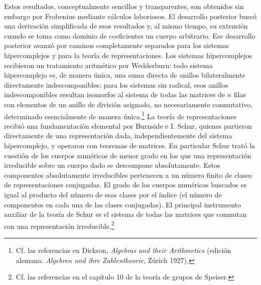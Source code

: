 \documentclass[11pt]{article}
\begin{document}
Estos resultados, conceptualmente sencillos y transparentes, son obtenidos sin embargo por Frobenius mediante cálculos laboriosos. El desarrollo posterior buscó una derivación simplificada de esos resultados y, al mismo tiempo, su extensión cuando se toma como dominio de coeficientes un cuerpo arbitrario. Ese desarrollo posterior avanzó por caminos completamente separados para los sistemas hipercomplejos y para la teoría de representaciones. Los sistemas hipercomplejos recibieron un tratamiento aritmético por Wedderburn: todo sistema hipercomplejo es, de manera única, una suma directa de anillos bilateralmente directamente indescomponibles; para los sistemas sin radical, esos anillos indescomponibles resultan isomorfos al sistema de todas las matrices de $n$ filas con elementos de un anillo de división asignado, no necesariamente conmutativo, determinado esencialmente de manera única.\footnote{Cf. las referencias en Dickson, \emph{Algebras and their Arithmetics} (edición alemana: \emph{Algebren und ihre Zahlentheorie}, Zúrich 1927).} La teoría de representaciones recibió una fundamentación elemental por Burnside e I. Schur, quienes partieron directamente de una representación dada, independientemente del sistema hipercomplejo, y operaron con teoremas de matrices. En particular Schur trató la cuestión de los cuerpos numéricos de menor grado en los que una representación irreducible sobre un cuerpo dado se descompone absolutamente. Estos componentes absolutamente irreducibles pertenecen a un número finito de clases de representaciones conjugadas. El grado de los cuerpos numéricos buscados es igual al producto del número de esas clases por el índice (el número de componentes en cada una de las clases conjugadas). El principal instrumento auxiliar de la teoría de Schur es el sistema de todas las matrices que conmutan con una representación irreducible.\footnote{Cf. las referencias en el capítulo 10 de la teoría de grupos de Speiser.}
\end{document}
